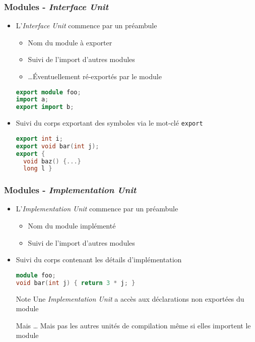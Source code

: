 \documentclass[C++.tex]{subfiles}
\begin{document}
\begin{frame}[fragile]
	\frametitle{Modules - \textit{Interface Unit}}
	\begin{itemize}
		\item L'\textit{Interface Unit} commence par un préambule
		\begin{itemize}
			\item Nom du module à exporter
			\item Suivi de l'import d'autres modules
			\item \ldots Éventuellement ré-exportés par le module
		\end{itemize}

		\begin{lstlisting}[language=C++]
export module foo;
import a;
export import b;\end{lstlisting}

		\item Suivi du corps exportant des symboles via le mot-clé \lstinline|export|

		\begin{lstlisting}[language=C++]
export int i;
export void bar(int j);
export {
  void baz() {...}
  long l }\end{lstlisting}
	\end{itemize}
\end{frame}

\begin{frame}[fragile]
	\frametitle{Modules - \textit{Implementation Unit}}
	\begin{itemize}
		\item L'\textit{Implementation Unit} commence par un préambule
		\begin{itemize}
			\item Nom du module implémenté
			\item Suivi de l'import d'autres modules
		\end{itemize}

		\item Suivi du corps contenant les détails d'implémentation

		\begin{lstlisting}[language=C++]
module foo;
void bar(int j) { return 3 * j; }\end{lstlisting}

		\begin{block}{Note}
			Une \textit{Implementation Unit} a accès aux déclarations non exportées du module

		\end{block}
	
\pause
	
		\begin{alertblock}{Mais \ldots}
			Mais pas les autres unités de compilation même si elles importent le module
		\end{alertblock}
	\end{itemize}
\end{frame}
\end{document}
